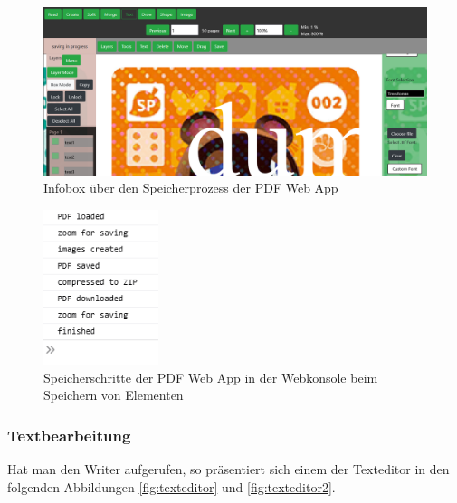 \begin{figure}[!htbp]
	\centering
	\includegraphics[width=1\textwidth]{"images/save-info.png"}
	\caption{Infobox über den Speicherprozess der PDF Web App}
	\label{fig:save-info}
\end{figure}

\begin{figure}[!htbp]
	\centering
	\includegraphics[width=0.3\textwidth]{"images/save-progress-steps.png"}
	\caption{Speicherschritte der PDF Web App in der Webkonsole beim Speichern von Elementen}
	\label{fig:save-progress-steps}
\end{figure}

\subsubsection{Textbearbeitung}
Hat man den Writer aufgerufen, so präsentiert sich einem der Texteditor in den folgenden Abbildungen \ref{fig:texteditor} und \ref{fig:texteditor2}.


